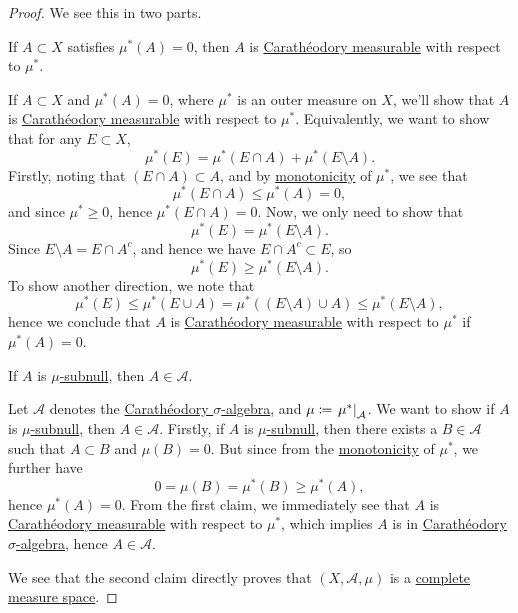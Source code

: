 \begin{proof}
	We see this in two parts.
	\begin{claim}
		If \(A\subset X\) satisfies \(\mu ^{\ast} (A) = 0\), then \(A\) is \hyperref[def:C-measurable]{Carathéodory measurable} with respect to \(\mu ^{\ast} \).
	\end{claim}
	\begin{explanation}
		If \(A\subset X\) and \(\mu^{\ast} (A) = 0\), where \(\mu^{\ast} \) is an outer measure on \(X\), we'll show that \(A\) is \hyperref[def:C-measurable]{Carathéodory measurable} with respect to \(\mu^{\ast} \). Equivalently, we want to show that for any \(E\subset X\),
		\[
			\mu^{\ast} (E) = \mu^{\ast} (E\cap A) + \mu^{\ast} (E \setminus A).
		\]
		Firstly, noting that \((E\cap A)\subset A\), and by \hyperref[def:outer-measure-montonicity]{monotonicity} of \(\mu^{\ast} \), we see that
		\[
			\mu^{\ast} (E\cap A)\leq \mu^{\ast} (A) = 0,
		\]
		and since \(\mu^{\ast} \geq 0\), hence \(\mu^{\ast} (E\cap A) = 0\). Now, we only need to show that
		\[
			\mu^{\ast} (E) = \mu^{\ast} (E\setminus A).
		\]
		Since \(E\setminus A = E\cap A^{c} \), and hence we have \(E\cap A^{c} \subset E\), so
		\[
			\mu^{\ast} (E)\geq \mu^{\ast} (E\setminus A).
		\]
		To show another direction, we note that
		\[
			\mu^{\ast} (E)\leq \mu^{\ast} (E\cup A) = \mu^{\ast} ((E\setminus A) \cup A) \leq \mu^{\ast} (E\setminus A),
		\]
		hence we conclude that \(A\) is \hyperref[def:C-measurable]{Carathéodory measurable} with respect to \(\mu^{\ast} \) if \(\mu^{\ast} (A)=0\).
	\end{explanation}

	\begin{claim}
		If \(A\) is \hyperref[def:mu-subnull-set]{\(\mu\)-subnull}, then \(A\in \mathcal{A} \).
	\end{claim}
	\begin{explanation}
		Let \(\mathcal{A} \) denotes the \hyperref[thm:Caratheodory-extension]{Carathéodory \(\sigma\)-algebra}, and \(\mu\coloneqq \left.\mu^{\ast} \right\vert_{\mathcal{A} }^{} \). We want to show if
		\(A\) is \hyperref[def:mu-subnull-set]{\(\mu\)-subnull}, then \(A\in\mathcal{A} \). Firstly, if \(A\) is \hyperref[def:mu-subnull-set]{\(\mu \)-subnull}, then there exists a \(B\in \mathcal{A} \) such that \(A\subset B\) and \(\mu (B) = 0\). But since from
		the \hyperref[def:outer-measure-montonicity]{monotonicity} of \(\mu ^{\ast} \), we further have
		\[
			0 = \mu(B) = \mu ^{\ast} (B) \geq \mu ^{\ast} (A),
		\]
		hence \(\mu ^{\ast} (A) = 0\). From the first claim, we immediately see that \(A\) is \hyperref[def:C-measurable]{Carathéodory measurable} with respect to \(\mu ^{\ast}\),
		which implies \(A\) is in \hyperref[thm:Caratheodory-extension]{Carathéodory \(\sigma\)-algebra}, hence \(A\in \mathcal{A} \).
	\end{explanation}

	We see that the second claim directly proves that \((X, \mathcal{A} , \mu )\) is a \hyperref[def:complete-measure-space]{complete measure space}.
\end{proof}

